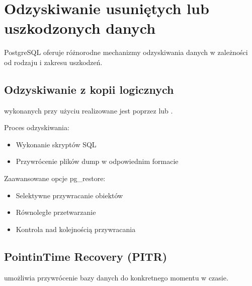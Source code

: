 \documentclass[letterpaper,10pt,polish]{sphinxmanual}
\begin{document}
\section{Odzyskiwanie usuniętych lub uszkodzonych danych}
\label{\detokenize{kopie_zapasowe_i_odzyskiwanie_danych:odzyskiwanie-usunietych-lub-uszkodzonych-danych}}
\sphinxAtStartPar
PostgreSQL oferuje różnorodne mechanizmy odzyskiwania danych w zależności od rodzaju i zakresu uszkodzeń.


\subsection{Odzyskiwanie z kopii logicznych}
\label{\detokenize{kopie_zapasowe_i_odzyskiwanie_danych:odzyskiwanie-z-kopii-logicznych}}
\sphinxAtStartPar
{} wykonanych przy użyciu  realizowane jest poprzez  lub .

\sphinxAtStartPar
Proces odzyskiwania:
\begin{itemize}
\item {} 
\sphinxAtStartPar
Wykonanie skryptów SQL

\item {} 
\sphinxAtStartPar
Przywrócenie plików dump w odpowiednim formacie

\end{itemize}

\sphinxAtStartPar
Zaawansowane opcje pg\_restore:
\begin{itemize}
\item {} 
\sphinxAtStartPar
Selektywne przywracanie obiektów

\item {} 
\sphinxAtStartPar
Równoległe przetwarzanie

\item {} 
\sphinxAtStartPar
Kontrola nad kolejnością przywracania

\end{itemize}


\subsection{Point\sphinxhyphen{}in\sphinxhyphen{}Time Recovery (PITR)}
\label{\detokenize{kopie_zapasowe_i_odzyskiwanie_danych:point-in-time-recovery-pitr}}
\sphinxAtStartPar
{} umożliwia przywrócenie bazy danych do konkretnego momentu w czasie.
\end{document}

